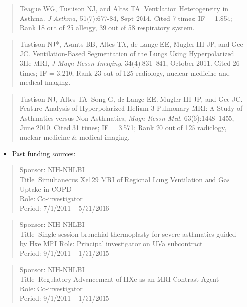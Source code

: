 \documentclass[11pt,]{article}
\providecommand{\tightlist}{%
  \setlength{\itemsep}{0pt}\setlength{\parskip}{0pt}}
\begin{document}
\begin{itemize}
  \begin{quote}
  Teague WG, Tustison NJ, and Altes TA. Ventilation Heterogeneity in
  Asthma. \emph{J Asthma}, 51(7):677-84, Sept 2014. Cited 7 times; IF =
  1.854; Rank 18 out of 25 allergy, 39 out of 58 respiratory system.
  \end{quote}

  \begin{quote}
  Tustison NJ*, Avants BB, Altes TA, de Lange EE, Mugler III JP, and Gee
  JC. Ventilation-Based Segmentation of the Lungs Using Hyperpolarized
  3He MRI, \emph{J Magn Reson Imaging}, 34(4):831--841, October 2011.
  Cited 26 times; IF = 3.210; Rank 23 out of 125 radiology, nuclear
  medicine and medical imaging.
  \end{quote}

  \begin{quote}
  Tustison NJ, Altes TA, Song G, de Lange EE, Mugler III JP, and Gee JC.
  Feature Analysis of Hyperpolarized Helium-3 Pulmonary MRI: A Study of
  Asthmatics versus Non-Asthmatics, \emph{Magn Reson Med},
  63(6):1448--1455, June 2010. Cited 31 times; IF = 3.571; Rank 20 out
  of 125 radiology, nuclear medicine \& medical imaging.
  \end{quote}

  \begin{itemize}
  \tightlist
  \item
    Past funding sources:
  \end{itemize}

  \begin{quote}
  Sponsor: NIH-NHLBI\\
  Title: Simultaneous Xe129 MRI of Regional Lung Ventilation and Gas
  Uptake in COPD\\
  Role: Co-investigator\\
  Period: 7/1/2011 -- 5/31/2016
  \end{quote}

  \begin{quote}
  Sponsor: NIH-NHLBI\\
  Title: Single-session bronchial thermoplasty for severe asthmatics
  guided by Hxe MRI Role: Principal investigator on UVa subcontract\\
  Period: 9/1/2011 -- 1/31/2015
  \end{quote}

  \begin{quote}
  Sponsor: NIH-NHLBI\\
  Title: Regulatory Advancement of HXe as an MRI Contrast Agent\\
  Role: Co-investigator\\
  Period: 9/1/2011 -- 1/31/2015
  \end{quote}


\end{itemize}
\end{document}
